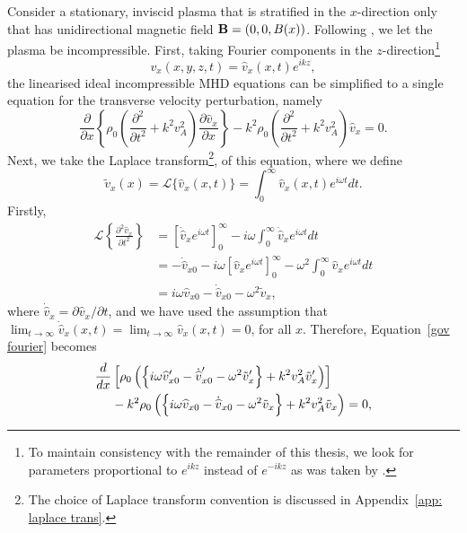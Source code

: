 Consider a stationary, inviscid plasma that is stratified in the $x$-direction only that has unidirectional magnetic field $\mathbf{B} = (0, 0, B(x))$. Following \cite{rae_etal81}, we let the plasma be incompressible. First, taking Fourier components in the $z$-direction\footnote{To maintain consistency with the remainder of this thesis, we look for parameters proportional to $e^{ikz}$ instead of $e^{-ikz}$ as was taken by \cite{rae_etal81}.}
\begin{equation}
v_x(x,y,z,t) = \widehat{v}_x(x,t)e^{ikz},
\end{equation}
the linearised ideal incompressible MHD equations can be simplified to a single equation for the transverse velocity perturbation, namely \citep{pri14}
\begin{equation}
\frac{\partial}{\partial x}\left\{\rho_0\left(\frac{\partial^2}{\partial t^2} + k^2v_A^2\right) \frac{\partial\widehat{v}_x}{\partial x}\right\} - k^2\rho_0\left(\frac{\partial^2}{\partial t^2} + k^2v_A^2\right)\widehat{v}_x = 0.
\label{gov fourier}
\end{equation}
Next, we take the Laplace transform\footnote{The choice of Laplace transform convention is discussed in Appendix~\ref{app: laplace trans}.}, of this equation, where we define
\begin{equation}
\tilde{v}_x(x) = \mathcal{L}\{\widehat{v}_x(x,t)\} = \int_0^\infty \widehat{v}_x(x,t)e^{i\omega t} dt.
\end{equation}
Firstly,
\begin{align}
\mathcal{L}\left\{\frac{\partial^2 \widehat{v}_x}{\partial t^2}\right\} & = \left[\dot{\widehat{v}}_x e^{i\omega t}\right]_0^\infty - i\omega \int_0^\infty \dot{\widehat{v}}_x e^{i\omega t} dt \\
& = -\dot{\widehat{v}}_{x0} - i\omega\left[\widehat{v}_x e^{i\omega t}\right]_0^\infty -\omega^2 \int_0^\infty \widehat{v}_x e^{i\omega t} dt \\
& = i\omega \widehat{v}_{x0} - \dot{\widehat{v}}_{x0} - \omega^2 \tilde{v}_x,
\end{align}
where $\dot{\widehat{v}}_x = \partial\widehat{v}_x/\partial t$, and we have used the assumption that $\lim_{t \to \infty} \dot{\widehat{v}}_{x}(x,t) = \lim_{t \to \infty} \widehat{v}_{x}(x,t) = 0$, for all $x$. Therefore, Equation~\eqref{gov fourier} becomes
\begin{align}
\frac{d}{dx} &\left[\rho_0\left(\left\{i\omega \widehat{v}_{x0}' - \dot{\widehat{v}}_{x0}' - \omega^2\tilde{v}_x'\right\} + k^2v_A^2 \tilde{v}_x'\right)\right] \notag \\
&- k^2\rho_0 \left(\left\{i\omega \widehat{v}_{x0} - \dot{\widehat{v}}_{x0} - \omega^2\tilde{v}_x\right\} + k^2v_A^2 \tilde{v}_x\right) = 0, \notag
\end{align}
